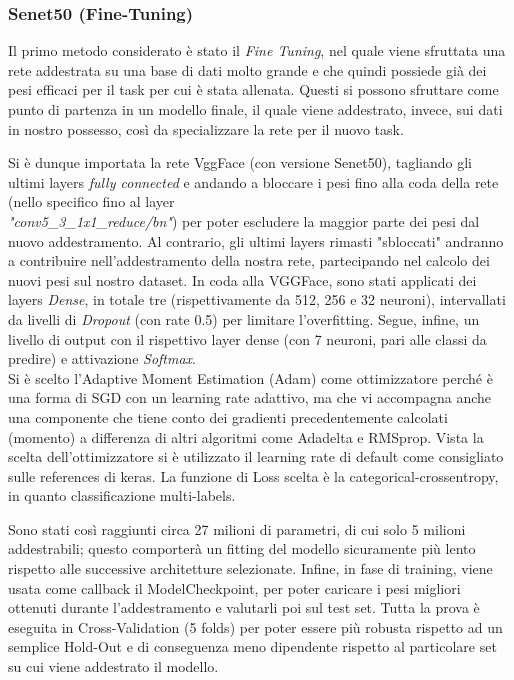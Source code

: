 \subsubsection{Senet50 (Fine-Tuning)}

Il primo metodo considerato è stato il \textit{Fine Tuning}, nel quale viene sfruttata una rete addestrata su una base di dati molto grande e che quindi possiede già dei pesi efficaci per il task per cui è stata allenata. Questi si possono sfruttare come punto di partenza in un modello finale, il quale viene addestrato, invece, sui dati in nostro possesso, così da specializzare la rete per il nuovo task. 

Si è dunque importata la rete VggFace (con versione Senet50), tagliando gli ultimi layers \textit{fully connected} e andando a bloccare i pesi fino alla coda della rete (nello specifico fino al layer\\\textit{"conv5\_3\_1x1\_reduce/bn"}) per poter escludere la maggior parte dei pesi dal nuovo addestramento. Al contrario, gli ultimi layers rimasti "sbloccati" andranno a contribuire nell'addestramento della nostra rete, partecipando nel calcolo dei nuovi pesi sul nostro dataset. In coda alla VGGFace, sono stati applicati dei layers \textit{Dense}, in totale tre (rispettivamente da 512, 256 e 32 neuroni), intervallati da livelli di \textit{Dropout} (con rate 0.5) per limitare l'overfitting. Segue, infine, un livello di output con il rispettivo layer dense (con 7 neuroni, pari alle classi da predire) e attivazione \textit{Softmax}.\\
Si è scelto l'Adaptive Moment Estimation (Adam) come ottimizzatore perché è una forma di SGD con un learning rate adattivo, ma che vi accompagna anche una componente che tiene conto dei gradienti precedentemente calcolati (momento) a differenza di altri algoritmi come Adadelta e RMSprop. Vista la scelta dell'ottimizzatore si è utilizzato il learning rate di default come consigliato sulle references di keras. La funzione di Loss scelta è la categorical-crossentropy, in quanto classificazione multi-labels.

Sono stati così raggiunti circa 27 milioni di parametri, di cui solo 5 milioni addestrabili; questo comporterà un fitting del modello sicuramente più lento rispetto alle successive architetture selezionate.
Infine, in fase di training, viene usata come callback il ModelCheckpoint, per poter caricare i pesi migliori ottenuti durante l'addestramento e valutarli poi sul test set. Tutta la prova è eseguita in Cross-Validation (5 folds) per poter essere più robusta rispetto ad un semplice Hold-Out e di conseguenza meno dipendente rispetto al particolare set su cui viene addestrato il modello.

